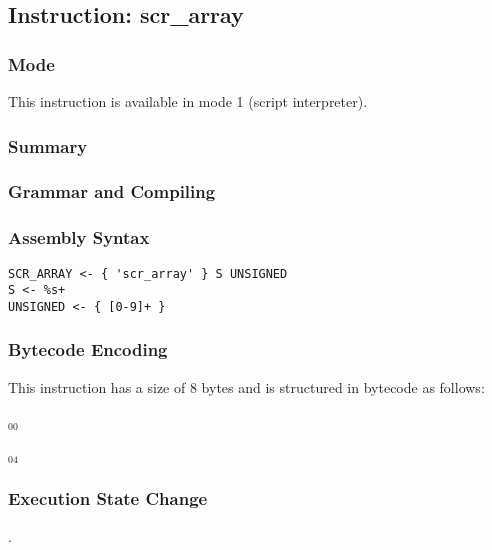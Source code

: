 \subsection{Instruction: scr\_array}

\subsubsection{Mode}
This instruction is available in mode 1 (script interpreter).
\subsubsection{Summary}


\subsubsection{Grammar and Compiling}


\subsubsection{Assembly Syntax}

\begin{myquote}
\begin{verbatim}
SCR_ARRAY <- { 'scr_array' } S UNSIGNED
S <- %s+
UNSIGNED <- { [0-9]+ }
\end{verbatim}
\end{myquote}

\subsubsection{Bytecode Encoding}

This instruction has a size of 8 bytes and is structured in bytecode as follows:

$_{00}$\ 



$_{04}$\ 

\subsubsection{Execution State Change}

.


